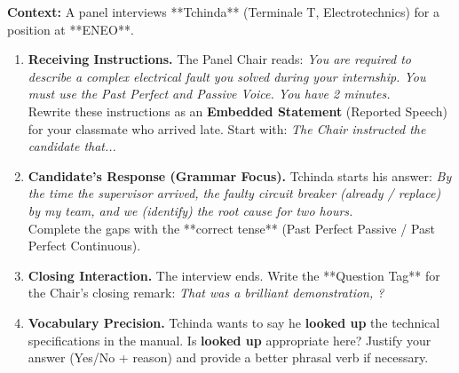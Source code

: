 \documentclass[11pt]{article}
\begin{document}
\begin{exercice}
\textbf{Context:} A panel interviews **Tchinda** (Terminale T, Electrotechnics) for a position at **ENEO**.

\begin{enumerate}
    \item \textbf{Receiving Instructions.} The Panel Chair reads: \og \textit{You are required to describe a complex electrical fault you solved during your internship. You must use the Past Perfect and Passive Voice. You have 2 minutes.} \fg\\
    Rewrite these instructions as an \textbf{Embedded Statement} (Reported Speech) for your classmate who arrived late. Start with: \textit{The Chair instructed the candidate that...}
    \item \textbf{Candidate's Response (Grammar Focus).} Tchinda starts his answer: \og \textit{By the time the supervisor arrived, the faulty circuit breaker \underline{\hspace{3cm}} (already / replace) by my team, and we \underline{\hspace{3cm}} (identify) the root cause for two hours.} \fg\\
    Complete the gaps with the **correct tense** (Past Perfect Passive / Past Perfect Continuous).
    \item \textbf{Closing Interaction.} The interview ends. Write the **Question Tag** for the Chair's closing remark: \og \textit{That was a brilliant demonstration, \underline{\hspace{3cm}}?} \fg
    \item \textbf{Vocabulary Precision.} Tchinda wants to say he \og \textbf{looked up} \fg the technical specifications in the manual. Is \og \textbf{looked up} \fg appropriate here? Justify your answer (Yes/No + reason) and provide a better phrasal verb if necessary.
\end{enumerate}
\end{exercice}
\end{document}
